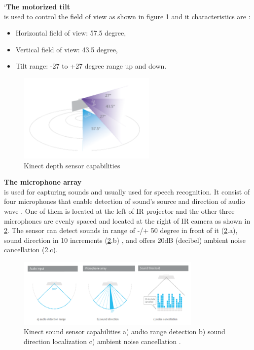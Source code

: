`\textbf{The motorized tilt}\\
 is used to control the field of view as shown in figure \ref{fig:cam4} and it characteristics are \cite{kinect15} : 
 
\begin{itemize}
\item  Horizontal field of view: 57.5 degree,
\item  Vertical field of view: 43.5 degree,
\item Tilt range: -27 to +27 degree range up and down.

\end{itemize}

\begin{figure}[H]
\centering
\includegraphics[width=0.6\textwidth]{img/afterworking2.png}
\caption{Kinect depth sensor capabilities}
\label{fig:cam4}
\end{figure}

\textbf{The microphone array} \\
is used for capturing sounds and usually used for speech recognition. It consist of four microphones that enable detection of sound’s source and direction of audio wave \cite{kinect15}. One of them is located at the left of IR projector and the other three microphones are evenly spaced and located at the right of IR camera as shown in \ref{fig:cam5}. The sensor can detect sounds in range of -/+ 50 degree in front of it (\ref{fig:cam5}.a), sound direction in 10 increments  (\ref{fig:cam5}.b) , and offers 20dB (decibel) ambient noise cancellation (\ref{fig:cam5}.c)\cite{kinect17}.

\begin{figure}[H]
\centering
\includegraphics[width=0.8\textwidth]{img/afterworking3.png}
\caption{Kinect sound sensor capabilities a) audio range detection b) sound direction localization c) ambient noise cancellation .
}
\label{fig:cam5}
\end{figure}


